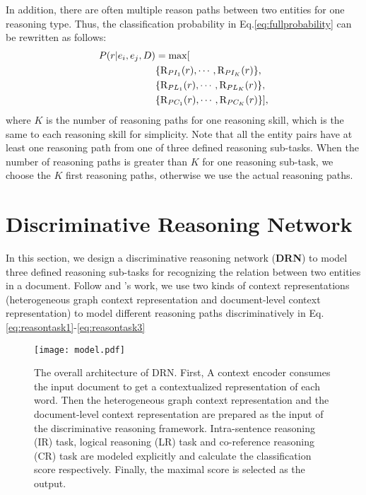 \documentclass[11pt,a4paper]{article}
\begin{document}
In addition, there are often multiple reason paths between two entities for one reasoning type.
Thus, the classification probability in Eq.\eqref{eq:fullprobability} can be rewritten as follows:
\begin{equation}
\begin{aligned}
P(r|e_i,e_j,D)&=\max[\\
&\{\textup{R}_{PI_1}(r),\cdots,\textup{R}_{PI_K}(r)\}, \\
&\{\textup{R}_{PL_1}(r),\cdots,\textup{R}_{PL_K}(r)\}, \\
&\{\textup{R}_{PC_1}(r),\cdots,\textup{R}_{PC_K}(r)\}],
\label{eq:multifullprobability}
\end{aligned}
\end{equation}
where $K$ is the number of reasoning paths for one reasoning skill, which is the same to each reasoning skill for simplicity.
Note that all the entity pairs have at least one reasoning path from one of three defined reasoning sub-tasks.
When the number of reasoning paths is greater than $K$ for one reasoning sub-task, we choose the $K$ first reasoning paths, otherwise we use the actual reasoning paths.

\section{Discriminative Reasoning Network}
\label{sec3}
In this section, we design a discriminative reasoning network (\textbf{DRN}) to model three defined reasoning sub-tasks for recognizing the relation between two entities in a document.
Follow \citeauthor{zeng-etal-2020-double} and \citeauthor{zhou2021atlop}'s work, we use two kinds of context representations (heterogeneous graph context representation and document-level context representation) to model different reasoning paths discriminatively in Eq.\eqref{eq:reasontask1}-\eqref{eq:reasontask3}
\begin{figure*}[t]
  \centering
  \texttt{[image: model.pdf]}
  \caption{The overall architecture of DRN. First, A context encoder consumes the input document to get a contextualized representation of each word. Then the heterogeneous graph context representation and the document-level context representation are prepared as the input of the discriminative reasoning framework. Intra-sentence reasoning (IR) task, logical reasoning (LR) task and co-reference reasoning (CR) task are modeled explicitly and calculate the classification score respectively. Finally, the maximal score is selected as the output.}
  \label{fig:model}
\end{figure*}
\end{document}
